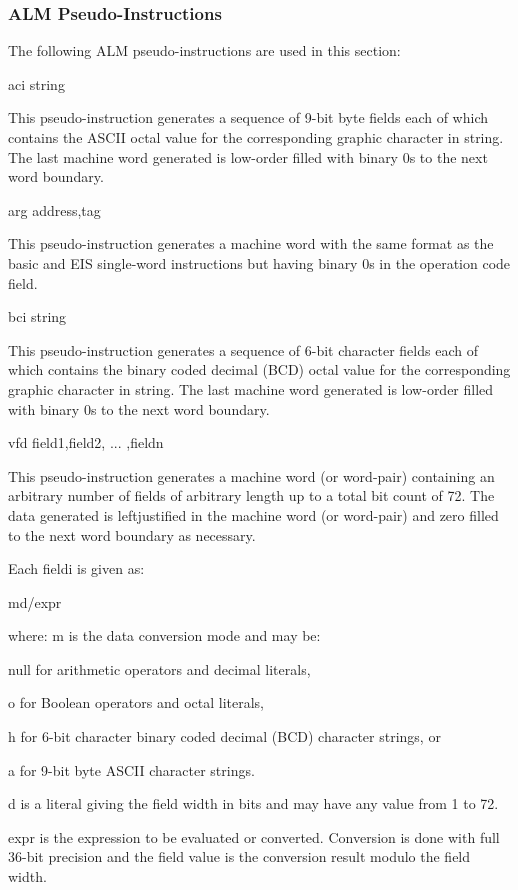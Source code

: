 \subsubsection{ALM Pseudo-Instructions}

The following ALM pseudo-instructions are used in this section:


aci string


This pseudo-instruction generates a sequence of 9-bit byte fields each of which
contains the ASCII octal value for the corresponding graphic character in
string. The last machine word generated is low-order filled with binary 0s to
the next word boundary.  

arg address,tag


This pseudo-instruction generates a machine word with the same format as the
basic and EIS single-word instructions but having binary 0s in the operation
code field.  

bci string

This pseudo-instruction generates a sequence of 6-bit character fields each of
which contains the binary coded decimal (BCD) octal value for the corresponding
graphic character in string. The last machine word generated is low-order
filled with binary 0s to the next word boundary.

vfd field1,field2, ... ,fieldn

This pseudo-instruction generates a machine word (or word-pair) containing an
arbitrary number of fields of arbitrary length up to a total bit count of 72.
The data generated is leftjustified in the machine word (or word-pair) and zero
filled to the next word boundary as necessary.

Each fieldi is given as:

md/expr

where: m is the data conversion mode and may be:

null for arithmetic operators and decimal literals,


o for Boolean operators and octal literals,

h for 6-bit character binary coded decimal (BCD) character strings, or

a for 9-bit byte ASCII character strings.

d is a literal giving the field width in bits and may have any value from 1 to
72.

expr is the expression to be evaluated or converted. Conversion is done with
full 36-bit precision and the field value is the conversion result modulo the
field width.

